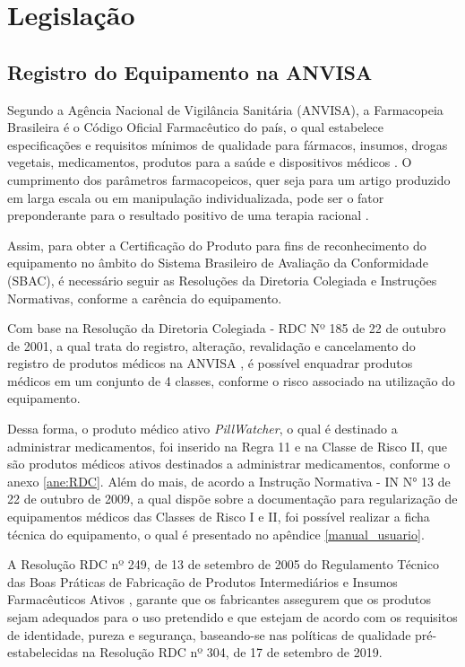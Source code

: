 \chapter[Legislação]{Legislação}

\section{Registro do Equipamento na ANVISA}

Segundo a Agência Nacional de Vigilância Sanitária (ANVISA), a Farmacopeia Brasileira é o Código Oficial Farmacêutico do país, o qual estabelece especificações e requisitos mínimos de qualidade para fármacos, insumos, drogas vegetais, medicamentos, produtos para a saúde e dispositivos médicos \cite{farmacopeia}. O cumprimento dos parâmetros farmacopeicos, quer seja para um artigo produzido em larga escala ou em manipulação individualizada, pode ser o fator preponderante para o resultado positivo de uma terapia racional \cite{Pianetti_2016}.

Assim, para obter a Certificação do Produto para fins de reconhecimento do equipamento no âmbito do Sistema Brasileiro de Avaliação da Conformidade (SBAC), é necessário seguir as Resoluções da Diretoria Colegiada e Instruções Normativas, conforme a carência do equipamento.

Com base na Resolução da Diretoria Colegiada - RDC  Nº 185 de 22 de outubro de 2001, a qual trata do registro, alteração, revalidação e cancelamento do registro de produtos médicos na ANVISA \cite{RDC_185}, é possível enquadrar produtos médicos em um conjunto de 4 classes, conforme o risco associado na utilização do equipamento.

Dessa forma, o produto médico ativo \textit{PillWatcher}, o qual é  destinado a administrar medicamentos, foi inserido na Regra 11 e na Classe de Risco II, que são produtos médicos ativos destinados a administrar medicamentos, conforme o anexo \ref{ane:RDC}. Além do mais, de acordo a Instrução Normativa - IN N° 13 de 22 de outubro de 2009, a qual dispõe sobre a documentação para regularização de equipamentos médicos das Classes de Risco I e II, foi possível realizar a ficha técnica do equipamento, o qual é presentado no apêndice \ref{manual_usuario}.

A Resolução RDC nº 249, de 13 de setembro de 2005 do Regulamento Técnico das Boas Práticas de Fabricação de Produtos Intermediários e Insumos Farmacêuticos Ativos \cite{RDC_249}, garante que os fabricantes assegurem que os produtos sejam adequados para o uso pretendido e que estejam de acordo com os requisitos de identidade, pureza e segurança, baseando-se nas políticas de qualidade pré-estabelecidas na Resolução RDC nº 304, de 17 de setembro de 2019.

